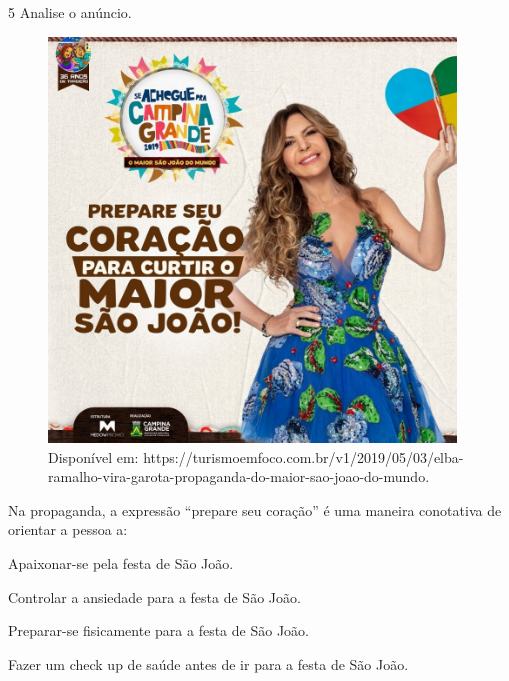
\num{5} Analise o anúncio.

\begin{figure}[H]
\centering\includegraphics[width=4.26392in,height=4.23333in]{./imgSAEB_6_POR/media/image40.jpeg}
\caption{Disponível em: https://turismoemfoco.com.br/v1/2019/05/03/elba-ramalho-vira-garota-propaganda-do-maior-sao-joao-do-mundo.}
\end{figure}

\noindent Na propaganda, a expressão ``prepare seu coração'' é uma maneira
conotativa de orientar a pessoa a:

\begin{escolha}
\item Apaixonar-se pela festa de São João.
\item Controlar a ansiedade para a festa de São João.
\item Preparar-se fisicamente para a festa de São João.
\item Fazer um check up de saúde antes de ir para a festa de São João.
\end{escolha}



